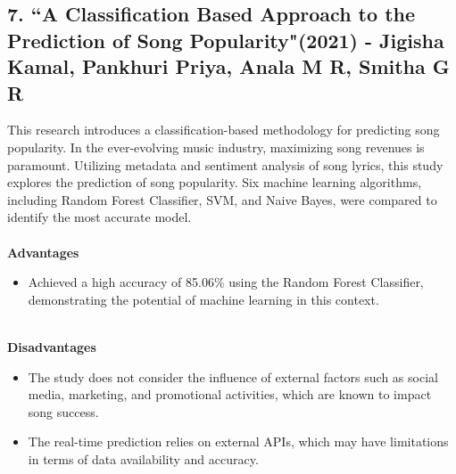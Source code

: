 \documentclass[11pt]{report}
\begin{document}
\subsection*{7.  ``A Classification Based Approach to the Prediction of Song Popularity"(2021) - Jigisha Kamal, Pankhuri Priya, Anala M R, Smitha G R\cite{reference7}}
This research introduces a classification-based methodology for predicting song popularity. In the ever-evolving music industry, maximizing song revenues is paramount. Utilizing metadata and sentiment analysis of song lyrics, this study explores the prediction of song popularity. Six machine learning algorithms, including Random Forest Classifier, SVM, and Naive Bayes, were compared to identify the most accurate model. 
\\ \\
\textbf{Advantages}
    \begin{itemize}
        \item Achieved a high accuracy of 85.06\% using the Random Forest Classifier, demonstrating the potential of machine learning in this context.
    \end{itemize}
\\    
    \textbf{Disadvantages}
    \begin{itemize}
        \item The study does not consider the influence of external factors such as social media, marketing, and promotional activities, which are known to impact song success.
        \item The real-time prediction relies on external APIs, which may have limitations in terms of data availability and accuracy.
    \end{itemize}\\\\
\end{document}
